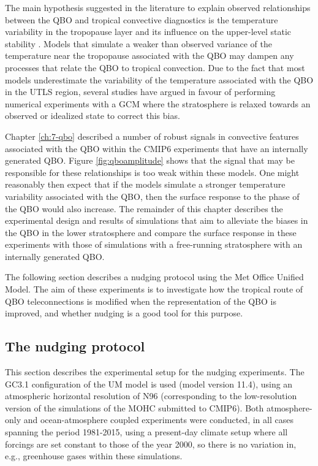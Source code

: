 The main hypothesis suggested in the literature to explain observed relationships between the QBO and tropical convective diagnostics is the temperature variability in the tropopause layer and its influence on the upper-level static stability \citep[][]{collimore2003,liess2012,nie2015,gray2018}.
Models that simulate a weaker than observed variance of the temperature near the tropopause associated with the QBO may dampen any processes that relate the QBO to tropical convection.
Due to the fact that most models underestimate the variability of the temperature associated with the QBO in the UTLS region, several studies have argued in favour of performing numerical experiments with a GCM where the stratosphere is relaxed towards an observed or idealized state \citep[e.g.][]{lee2018,martin2021} to correct this bias. 

Chapter \ref{ch:7-qbo} described a number of robust signals in convective features associated with the QBO within the CMIP6 experiments that have an internally generated QBO. 
Figure \ref{fig:qboamplitude} shows that the signal that may be responsible for these relationships is too weak within these models. 
One might reasonably then expect that if the models simulate a stronger temperature variability associated with the QBO, then the surface response to the phase of the QBO would also increase. 
The remainder of this chapter describes the experimental design and results of simulations that aim to alleviate the biases in the QBO in the lower stratosphere and compare the surface response in these experiments with those of simulations with a free-running stratosphere with an internally generated QBO.

The following section describes a nudging protocol using the Met Office Unified Model. The aim of these experiments is to investigate how the tropical route of QBO teleconnections is modified when the representation of the QBO is improved, and whether nudging is a good tool for this purpose.

\subsection{The nudging protocol}



This section describes the experimental setup for the nudging experiments. 
The GC3.1 configuration of the UM model is used (model version 11.4), using an atmospheric horizontal resolution of N96 (corresponding to the low-resolution version of the simulations of the MOHC submitted to CMIP6). 
Both atmosphere-only and ocean-atmosphere coupled experiments were conducted, in all cases spanning the period 1981-2015, using a present-day climate setup where all forcings are set constant to those of the year 2000, so there is no variation in, e.g., greenhouse gases within these simulations.

